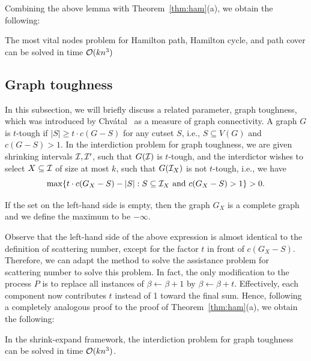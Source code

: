 Combining the above lemma with Theorem~\ref{thm:ham}(a), we obtain the following:
\begin{corollary}
The most vital nodes problem  for Hamilton path, Hamilton cycle, and path cover can be solved in time $\mathcal{O}(kn^3)$
\end{corollary}

\subsection{Graph toughness}
\label{subsection:tough}
In this subsection, we will briefly discuss a related parameter, graph toughness, which was introduced by Chv\'{a}tal~\cite{Chvatal1973} as a measure of graph connectivity. 
A graph $G$ is $t$-tough if $|S| \geq t \cdot c(G - S)$ for any cutset $S$, i.e., $S \subseteq V(G)$ and $c(G - S) > 1$.
In the interdiction problem for graph toughness, we are given shrinking intervals $\mathcal{I}, \mathcal{I}'$, such that $G(\mathcal{I})$ is $t$-tough, and the interdictor wishes to select $X \subseteq \mathcal{I}$ of size at most $k$, such that $G(\mathcal{I}_X)$ is not $t$-tough, i.e., we have
\[
	\max \{t \cdot c(G_X - S) - |S|  : S \subseteq \mathcal{I}_X \text{ and } c(G_X - S) > 1 \} > 0.
\]

If the set on the left-hand side is empty, then the graph $G_X$ is a complete graph and we define the maximum to be $-\infty$.

Observe that the left-hand side of the above expression is almost identical to the definition of scattering number, except for the factor $t$ in front of $c(G_X - S)$.
Therefore, we can adapt the method to solve the assistance problem for scattering number to solve this problem.
In fact, the only modification to the process $P$ is to replace all instances of $\beta \leftarrow \beta + 1$ by $\beta \leftarrow \beta + t$.
Effectively, each component now contributes $t$ instead of 1 toward the final sum.
Hence, following a completely analogous proof to the proof of Theorem~\ref{thm:ham}(a), we obtain the following:

\begin{corollary}
In the shrink-expand framework, the interdiction problem for graph toughness can be solved in time $\mathcal{O}(kn^3)$.
\end{corollary}
